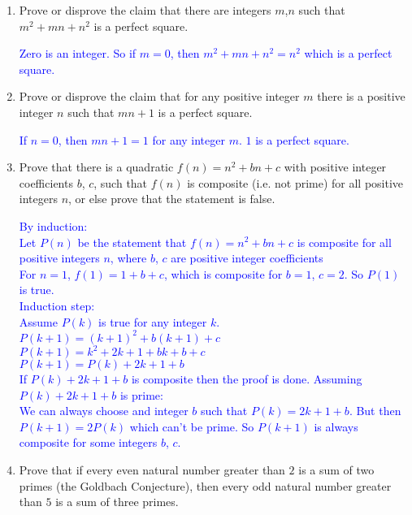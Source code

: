 \documentclass[13.5pt]{article}
\begin{document}
\begin{enumerate}

\item{Prove or disprove the claim that there are integers \(m\),\(n\) such that \( m^2+mn+n^2\) is a perfect square.}

\textcolor{blue} {Zero is an integer. So if \(m=0\), then \( m^2+mn+n^2=n^2\) which is a perfect square.}

\item{Prove or disprove the claim that for any positive integer \(m\) there is a positive integer \(n\) such that \(mn+1\) is a perfect square.}

\textcolor{blue} {If \(n=0\), then \(mn+1=1\) for any integer \(m\). \(1\) is a perfect square.}

\item{Prove that there is a quadratic \(f(n)=n^2+bn+c\) with positive integer coefficients \(b\), \(c\), such that \(f(n)\) is composite (i.e. not prime) for all positive integers \(n\), or else prove that the statement is false.}   

\textcolor{blue} {By induction:}\\
\textcolor{blue} {Let \(P(n)\) be the statement that \(f(n)=n^2+bn+c\) is composite for all positive integers \(n\), where \(b\), \(c\) are positive integer coefficients}\\
\textcolor{blue} {For \(n=1\), \(f(1)=1+b+c\), which is composite for \(b=1\), \(c=2\). So \(P(1)\) is true.}\\
\textcolor{blue} {Induction step:}\\
\textcolor{blue} {Assume \(P(k)\) is true for any integer \(k\).}
\textcolor{blue} {\(P(k+1) = (k+1)^2+b(k+1)+c\)}\\
\textcolor{blue} {\(P(k+1) = k^2+2k+1+bk+b+c\)}\\
\textcolor{blue} {\(P(k+1) = P(k)+2k+1+b\)}\\
\textcolor{blue} {If \(P(k)+2k+1+b\) is composite then the proof is done. Assuming \(P(k)+2k+1+b\) is prime:}\\
\textcolor{blue} {We can always choose and integer \(b\) such that  \(P(k) = 2k+1+b\). But then \(P(k+1) = 2P(k)\) which can't be prime. So \(P(k+1)\) is always composite for some integers \(b\), \(c\).} 

\item{Prove that if every even natural number greater than \(2\) is a sum of two primes (the Goldbach Conjecture), then every odd natural number greater than \(5\) is a sum of three primes.}


\end{enumerate}
\end{document}
